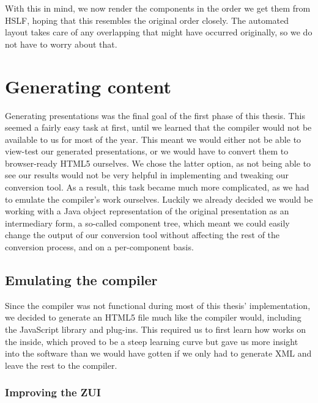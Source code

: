     With this in mind, we now render the components in the order we get them
    from HSLF, hoping that this resembles the original order closely. The
    automated layout takes care of any overlapping that might have occurred
    originally, so we do not have to worry about that.

  \section{Generating \mxp content}

   Generating \mxp presentations was the final goal of the first phase of this
   thesis. This seemed a fairly easy task at first, until we learned that the
   \mxp compiler would not be available to us for most of the year. This meant
   we would either not be able to view-test our generated presentations, or we
   would have to convert them to browser-ready HTML5 ourselves. We chose the
   latter option, as not being able to see our results would not be very
   helpful in implementing and tweaking our conversion tool. As a result, this
   task became much more complicated, as we had to emulate the compiler's work
   ourselves. Luckily we already decided we would be working with a Java object
   representation of the original presentation as an intermediary form, a
   so-called component tree, which meant we could easily change the output of
   our conversion tool without affecting the rest of the conversion process,
   and on a per-component basis.

   \subsection{Emulating the \mxp compiler}

    Since the \mxp compiler was not functional during most of this thesis'
    implementation, we decided to generate an HTML5 file much like the \mxp
    compiler would, including the \mxp JavaScript library and plug-ins. This
    required us to first learn how \mxp works on the inside, which proved to be
    a steep learning curve but gave us more insight into the software than we
    would have gotten if we only had to generate \mxp XML and leave the rest to
    the compiler.

    \subsubsection{Improving the ZUI}
   
